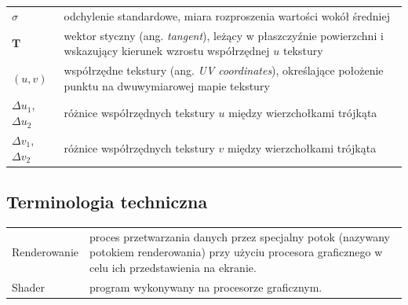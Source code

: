 \begin{tabular}{@{}p{2.5cm}p{11.75cm}@{}}
  $\sigma$                                       & odchylenie standardowe, miara rozproszenia wartości wokół średniej                                                                                             \\[0.5em]
  $\mathbf{T}$                                   & wektor styczny (ang. \textit{tangent}), leżący w płaszczyźnie powierzchni i wskazujący kierunek wzrostu współrzędnej $u$ tekstury                              \\[0.5em]
  $(u, v)$                                       & współrzędne tekstury (ang. \textit{UV coordinates}), określające położenie punktu na dwuwymiarowej mapie tekstury                                              \\[0.5em]
  $\Delta u_1$, $\Delta u_2$                     & różnice współrzędnych tekstury $u$ między wierzchołkami trójkąta                                                                                               \\[0.5em]
  $\Delta v_1$, $\Delta v_2$                     & różnice współrzędnych tekstury $v$ między wierzchołkami trójkąta                                                                                               \\[0.5em]
\end{tabular}

\subsection*{Terminologia techniczna}

\begin{tabular}{@{}p{3.5cm}p{10.75cm}@{}}
  Renderowanie & proces przetwarzania danych przez specjalny potok (nazywany potokiem renderowania) przy użyciu procesora graficznego w celu ich przedstawienia na ekranie. \\[0.5em]

  Shader       & program wykonywany na procesorze graficznym.                                                                                                               \\[0.5em]
\end{tabular}

\newpage
